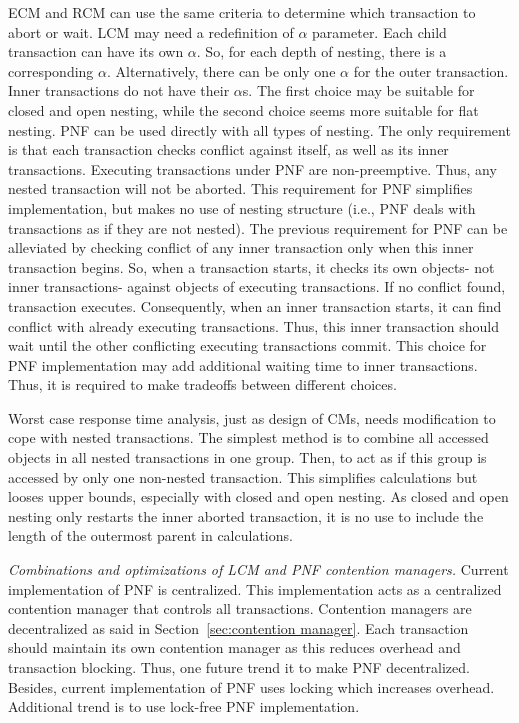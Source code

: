 \documentclass[12pt,english]{report}
\begin{document}
ECM and RCM can use the same criteria to determine which transaction to abort or wait. LCM may need a redefinition of $\alpha$ parameter. Each child transaction can have its own $\alpha$. So, for each depth of nesting, there is a corresponding $\alpha$. Alternatively, there can be only one $\alpha$ for the outer transaction. Inner transactions do not have their $\alpha$s. The first choice may be suitable for closed and open nesting, while the second choice seems more suitable for flat nesting. PNF can be used directly with all types of nesting. The only requirement is that each transaction checks conflict against itself, as well as its inner transactions. Executing transactions under PNF are non-preemptive. Thus, any nested transaction will not be aborted. This requirement for PNF simplifies implementation, but makes no use of nesting structure (i.e., PNF deals with transactions as if they are not nested). The previous requirement for PNF can be alleviated by checking conflict of any inner transaction only when this inner transaction begins. So, when a transaction starts, it checks its own objects- not inner transactions- against objects of executing transactions. If no conflict found, transaction executes. Consequently, when an inner transaction starts, it can find conflict with already executing transactions. Thus, this inner transaction should wait until the other conflicting executing transactions commit. This choice for PNF implementation may add additional waiting time to inner transactions. Thus, it is required to make tradeoffs between different choices.

Worst case response time analysis, just as design of CMs, needs modification to cope with nested transactions. The simplest method is to combine all accessed objects in all nested transactions in one group. Then, to act as if this group is accessed by only one non-nested transaction. This simplifies calculations but looses upper bounds, especially with closed and open nesting. As closed and open nesting only restarts the inner aborted transaction, it is no use to include the length of the outermost parent in calculations.

\textit{Combinations and optimizations of LCM and PNF contention managers.} 
Current implementation of PNF is centralized. This implementation acts as a centralized contention manager that controls all transactions. Contention managers are decentralized as said in Section~\ref{sec:contention manager}. Each transaction should maintain its own contention manager as this reduces overhead and transaction blocking. Thus, one future trend it to make PNF decentralized. Besides, current implementation of PNF uses locking which increases overhead. Additional trend is to use lock-free PNF implementation.
\end{document}
